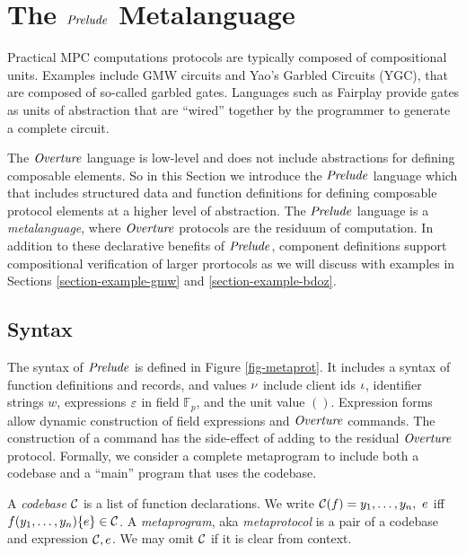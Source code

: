 \section{The $\mathit{Prelude}$ Metalanguage}
\label{section-metalang}

Practical MPC computations protocols are
typically composed of compositional units. Examples include GMW circuits
and Yao's Garbled Circuits (YGC), that are composed of so-called
garbled gates. Languages such as Fairplay \cite{269581} provide gates as
units of abstraction that are ``wired'' together by the programmer to
generate a complete circuit.

The $\mathit{Overture}$ language is low-level and does not include abstractions
for defining composable elements. So in this Section we introduce the
$\mathit{Prelude}$ language which that includes structured data and function
definitions for defining composable protocol elements at a higher
level of abstraction.  The $\mathit{Prelude}$ language is a
\emph{metalanguage}, where $\mathit{Overture}$ protocols are the residuum of
computation. In addition to these declarative benefits of $\mathit{Prelude}$,
component definitions support compositional verification of larger
prortocols as we will discuss with examples in Sections
\ref{section-example-gmw} and \ref{section-example-bdoz}.

\metaprotfig

\subsection{Syntax}

The syntax of $\mathit{Prelude}$ is defined in Figure
\ref{fig-metaprot}.  It includes a syntax of function
definitions and records, and values $\nu$ include client ids $\iota$, identifier
strings $w$, expressions $\varepsilon$ in field $\mathbb{F}_p$, and the unit value $()$.
Expression forms allow dynamic construction of field expressions and $\mathit{Overture}$ commands.
The construction of a command has the side-effect of adding to the residual
$\mathit{Overture}$ protocol. Formally, we consider a complete metaprogram to include both a
codebase and a ``main'' program that uses the codebase. 
\begin{definition}
A \emph{codebase} $\mathcal{C}$ is a list of function 
declarations. We write $ \mathcal{C}(f) = y_1,\ldots,y_n,\ e$
iff $f(y_1,\ldots,y_n) \{ e \} \in \mathcal{C}$.
A \emph{metaprogram}, aka \emph{metaprotocol}  is a pair of a 
codebase and expression $\mathcal{C}, e$. We may omit
$\mathcal{C}$ if it is clear from context.  
\end{definition}

